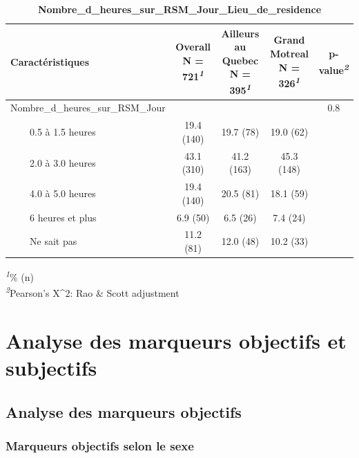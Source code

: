 \documentclass[
]{article}
\begin{document}
\begin{table}[!t]
\caption{\label{tab:unnamed-chunk-53}\textbf{Nombre\_d\_heures\_sur\_RSM\_Jour\_Lieu\_de\_residence}} 
\fontsize{12.0pt}{14.4pt}\selectfont
\begin{tabular*}{\linewidth}{@{\extracolsep{\fill}}lcccc}
\toprule
\textbf{Caractéristiques} & \textbf{Overall}  N = 721\textsuperscript{\textit{1}} & \textbf{Ailleurs au Quebec}  N = 395\textsuperscript{\textit{1}} & \textbf{Grand Motreal}  N = 326\textsuperscript{\textit{1}} & \textbf{p-value}\textsuperscript{\textit{2}} \\ 
\midrule\addlinespace[2.5pt]
Nombre\_d\_heures\_sur\_RSM\_Jour &  &  &  & 0.8 \\ 
    0.5 à 1.5 heures & 19.4 (140) & 19.7 (78) & 19.0 (62) &  \\ 
    2.0 à 3.0 heures & 43.1 (310) & 41.2 (163) & 45.3 (148) &  \\ 
    4.0 à 5.0 heures & 19.4 (140) & 20.5 (81) & 18.1 (59) &  \\ 
    6 heures et plus & 6.9 (50) & 6.5 (26) & 7.4 (24) &  \\ 
    Ne sait pas & 11.2 (81) & 12.0 (48) & 10.2 (33) &  \\ 
\bottomrule
\end{tabular*}
\begin{minipage}{\linewidth}
\textsuperscript{\textit{1}}\% (n)\\
\textsuperscript{\textit{2}}Pearson's X\^{}2: Rao \& Scott adjustment\\
\end{minipage}
\end{table}

\hypertarget{analyse-des-marqueurs-objectifs-et-subjectifs}{%
\section{Analyse des marqueurs objectifs et
subjectifs}\label{analyse-des-marqueurs-objectifs-et-subjectifs}}

\hypertarget{analyse-des-marqueurs-objectifs}{%
\subsection{Analyse des marqueurs
objectifs}\label{analyse-des-marqueurs-objectifs}}

\hypertarget{marqueurs-objectifs-selon-le-sexe}{%
\subsubsection{Marqueurs objectifs selon le
sexe}\label{marqueurs-objectifs-selon-le-sexe}}
\end{document}
